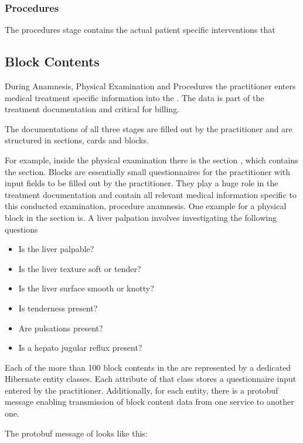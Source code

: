 \subsubsection{Procedures}
The procedures stage contains the actual patient specific interventions that \todo

\subsection{Block Contents}
During Anamnesis,
Physical Examination and Procedures the practitioner enters medical treatment specific information into the \AVS.
The data is part of the treatment documentation and critical for billing.

The documentations of all three stages are filled out by the practitioner and are structured in sections,
cards and blocks.

For example, inside the physical examination there is the section ,
which contains the section.
Blocks are essentially small questionnaires for the practitioner with input fields to be filled out by the practitioner.
They play a huge role in the treatment documentation
and contain all relevant medical information specific to this conducted examination,
procedure anamnesis.
One example for a physical block in the section is.
A liver palpation involves investigating the following questions

\begin{itemize}
    \item Is the liver palpable?
    \item Is the liver texture soft or tender?
    \item Is the liver surface smooth or knotty?
    \item Is tenderness present?
    \item Are pulsations present?
    \item Is a hepato jugular reflux present?
\end{itemize}

Each of the more than 100 block contents in the \AVS are represented by a dedicated Hibernate entity classes.
Each attribute of that class stores a questionnaire input entered by the practitioner.
Additionally, for each entity, there is a protobuf message enabling transmission of block content data from one service
to another one.

The protobuf message of  looks like this:

